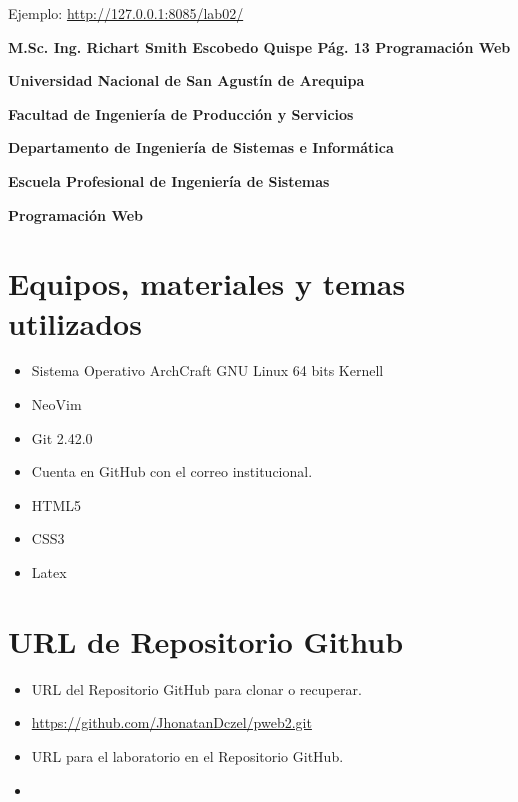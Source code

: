 Ejemplo: \url{http://127.0.0.1:8085/lab02/}

\textbf{M.Sc. Ing. Richart Smith Escobedo Quispe Pág. 13 Programación Web}

\textbf{Universidad Nacional de San Agustín de Arequipa}

\textbf{Facultad de Ingeniería de Producción y Servicios}

\textbf{Departamento de Ingeniería de Sistemas e Informática}

\textbf{Escuela Profesional de Ingeniería de Sistemas}

\textbf{Programación Web}
		
	\section{Equipos, materiales y temas utilizados}
	\begin{itemize}
		\item Sistema Operativo ArchCraft GNU Linux 64 bits Kernell
		\item NeoVim
		\item Git 2.42.0
		\item Cuenta en GitHub con el correo institucional.
    \item HTML5
    \item CSS3
    \item Latex
	\end{itemize}
	\section{URL de Repositorio Github}
	\begin{itemize}
            \item URL del Repositorio GitHub para clonar o recuperar.
            \item \url{https://github.com/JhonatanDczel/pweb2.git}
            \item URL para el laboratorio \itemPracticeNumber{} en el Repositorio GitHub.
            \item \itemUrl
	\end{itemize}

